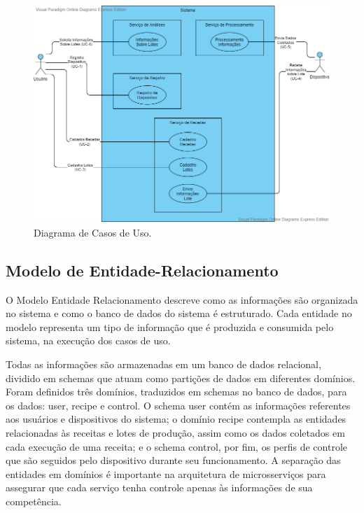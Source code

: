 \begin{figure}[ht]
    \centering
    \includegraphics[scale=0.45]{figuras/projeto/software/diagrama_casos_de_uso.png}
    \caption{Diagrama de Casos de Uso.}
    \label{fig:diagrama_caso_de_usos}
\end{figure}

\subsection{Modelo de Entidade-Relacionamento}

O Modelo Entidade Relacionamento descreve como as informações são organizada no sistema e como o banco de dados do sistema é estruturado. 
Cada entidade no modelo representa um tipo de informação que é produzida e consumida pelo sistema, na execução dos casos de uso. 

Todas as informações são armazenadas em um banco de dados relacional, dividido em schemas que atuam como partições de dados em diferentes domínios. 
Foram definidos três domínios, traduzidos em schemas no banco de dados, para os dados: user, recipe e control. O schema user contém as informações 
referentes aos usuários e dispositivos do sistema; o domínio recipe contempla as entidades relacionadas às receitas e lotes de produção, assim como 
os dados coletados em cada execução de uma receita; e o schema control, por fim, os perfis de controle que são seguidos pelo dispositivo durante 
seu funcionamento. A separação das entidades em domínios é importante na arquitetura de microsserviços para assegurar que cada serviço tenha 
controle apenas às informações de sua competência. 

